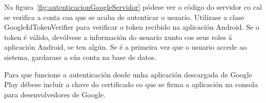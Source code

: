 Na figura~\ref{fig:autenticacionGoogleServidor} pódese ver o código do servidor co cal se verifica a conta coa que se acaba de autenticar o usuario. Utilízase a clase GoogleIdTokenVerifier para verificar o token recibido na aplicación Android. Se o token é válido, devólvese a información do usuario xunto cos seus roles á aplicación Android, se ten algún. Se é a primeira vez que o usuario accede ao sistema, gardarase a súa conta na base de datos.

Para que funcione a autenticación desde unha aplicación descargada de Google Play débese incluír a chave do certificado co que se firma a aplicación \cite{firmaAplicacion} na consola para desenvolvedores de Google.
